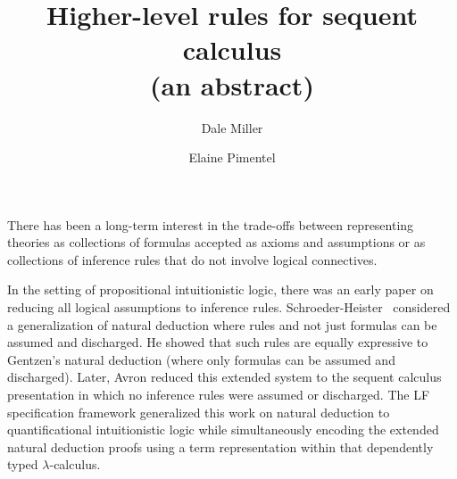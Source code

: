 \documentclass[runningheads]{llncs}
\begin{document}
\title{
       Higher-level rules for sequent calculus\\(an abstract)
}
\author{Dale Miller%
        \and
        Elaine Pimentel%
}

\maketitle              

There has been a long-term interest in the trade-offs between
representing theories as collections of formulas accepted as axioms
and assumptions or as collections of inference rules that do not
involve logical connectives.


In the setting of propositional intuitionistic logic, there was an early
paper on reducing all logical assumptions to inference rules.
Schroeder-Heister~\cite{schroeder-heister84} considered a
generalization of natural deduction where rules and not just formulas
can be assumed and discharged.  He showed that such rules are equally
expressive to Gentzen's natural deduction (where only formulas can be
assumed and discharged).  Later, Avron \cite{avron90ndjfl} reduced
this extended system to the sequent calculus presentation in which no
inference rules were assumed or discharged.  The LF
\cite{harper93jacm} specification framework generalized this work on
natural deduction to quantificational intuitionistic logic while
simultaneously encoding the extended natural deduction proofs using a
term representation within that dependently typed $\lambda$-calculus.

\end{document}
